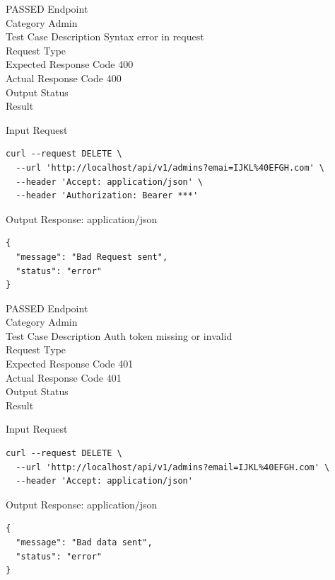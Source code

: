 \begin{testcase}{40}{PASSED}
Endpoint \hfill {}\\
Category \hfill Admin\\
Test Case Description \hfill Syntax error in request\\

Request Type    \hfill {}\\
Expected Response Code    \hfill 400\\
Actual Response Code    \hfill 400\\

Output Status \hfill {}\\
Result \hfill {}

\begin{ipblock}{Input Request}
\begin{verbatim}
curl --request DELETE \
  --url 'http://localhost/api/v1/admins?emai=IJKL%40EFGH.com' \
  --header 'Accept: application/json' \
  --header 'Authorization: Bearer ***'
\end{verbatim}
\end{ipblock}

\begin{opblock}{Output Response: application/json}
\begin{verbatim}
{
  "message": "Bad Request sent",
  "status": "error"
}
\end{verbatim}
\end{opblock}
\end{testcase}

\begin{testcase}{41}{PASSED}
Endpoint \hfill {}\\
Category \hfill Admin\\
Test Case Description \hfill Auth token missing or invalid\\

Request Type    \hfill {}\\
Expected Response Code    \hfill 401\\
Actual Response Code    \hfill 401\\

Output Status \hfill {}\\
Result \hfill {}

\begin{ipblock}{Input Request}
\begin{verbatim}
curl --request DELETE \
  --url 'http://localhost/api/v1/admins?email=IJKL%40EFGH.com' \
  --header 'Accept: application/json'
\end{verbatim}
\end{ipblock}

\begin{opblock}{Output Response: application/json}
\begin{verbatim}
{
  "message": "Bad data sent",
  "status": "error"
}
\end{verbatim}
\end{opblock}
\end{testcase}

